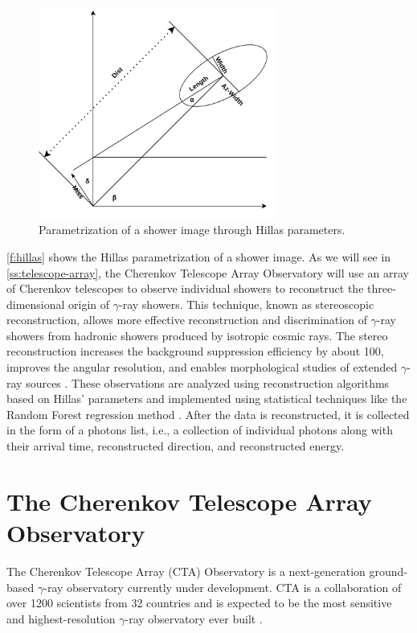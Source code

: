 \begin{figure}[ht] 
\centering
\includegraphics[width=0.7\textwidth]{figures/introduction/hillas.png}
\caption{Parametrization of a shower image through Hillas parameters.}
\label{f:hillas}
\end{figure}
\autoref{f:hillas} shows the Hillas parametrization of a shower image.
As we will see in \autoref{ss:telescope-array}, the Cherenkov Telescope Array Observatory will use an array of Cherenkov telescopes to observe individual showers to reconstruct the three-dimensional origin of $\gamma$-ray showers. This technique, known as stereoscopic reconstruction, allows more effective reconstruction and discrimination of $\gamma$-ray showers from hadronic showers produced by isotropic cosmic rays. The stereo reconstruction increases the background suppression efficiency by about 100, improves the angular resolution, and enables morphological studies of extended $\gamma$-ray sources \cite{Spurio2018}.
These observations are analyzed using reconstruction algorithms based on Hillas’ parameters and implemented using statistical techniques like the Random Forest regression method \cite{Albert2008}. After the data is reconstructed, it is collected in the form of a photons list, i.e., a collection of individual photons along with their arrival time, reconstructed direction, and reconstructed energy. 



\section{The Cherenkov Telescope Array Observatory}
\label{s:CTA}
The Cherenkov Telescope Array (CTA) Observatory is a next-generation ground-based $\gamma$-ray observatory currently under development. CTA is a collaboration of over 1200 scientists from 32 countries and is expected to be the most sensitive and highest-resolution $\gamma$-ray observatory ever built \cite{ScienceWithCherenkovTelescopeArray2018}.

